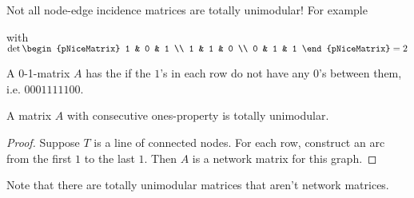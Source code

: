 \begin{remark}
    Not all node-edge incidence matrices are totally unimodular! For example
    \\
    \begin{minipage}{\textwidth}
        \centering
        \begin{minipage}{0.25\textwidth}
        \end{minipage}
        \begin{minipage}{0.3\textwidth}
            with $\det \begin{pNiceMatrix}
                    1 & 0 & 1 \\
                    1 & 1 & 0 \\
                    0 & 1 & 1
                \end{pNiceMatrix} = 2$
        \end{minipage}
    \end{minipage}
\end{remark}
\begin{definition}
    A 0-1-matrix $A$ has the  if the $1$'s in each row
    do not have any $0$'s between them, i.e. $0001111100$.
\end{definition}
\begin{corollary} \label{thm:cop-is-tu}
    A matrix $A$ with consecutive ones-property is totally unimodular.
\end{corollary}
\begin{proof}
    Suppose $T$ is a line of connected nodes.
    For each row, construct an arc from the first $1$ to the last $1$. Then $A$ is a network matrix for this graph.
\end{proof}
Note that there are totally unimodular matrices that aren't network matrices.
